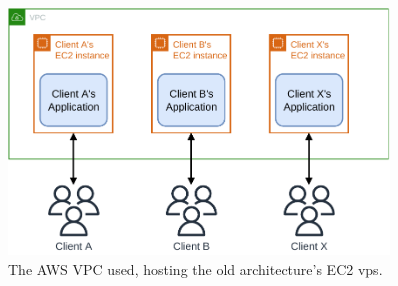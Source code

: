 \begin{figure}[!htbp]
    \centering
    \includegraphics[width=0.90\textwidth]{img/diagrams/pdf/old-arch-overview.drawio.pdf}
    \caption[AWS VPC Overview]{The AWS VPC used, hosting the old architecture's EC2 \gls{vps}.}
    \label{fig:old-arch-overview}
\end{figure}
    